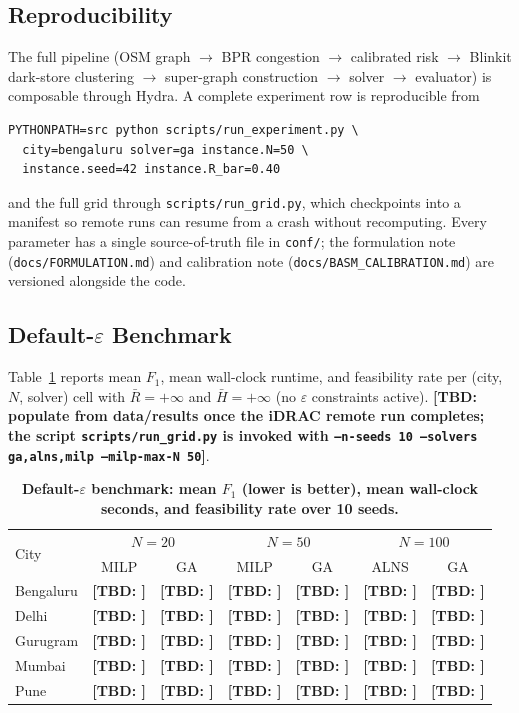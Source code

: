\documentclass{ieeeaccess}
\newcommand{\TBD}[1]{\textbf{[TBD: #1]}}
\begin{document}
\subsection{Reproducibility}
The full pipeline (OSM graph $\rightarrow$ BPR congestion $\rightarrow$
calibrated risk $\rightarrow$ Blinkit dark-store clustering $\rightarrow$
super-graph construction $\rightarrow$ solver $\rightarrow$ evaluator)
is composable through Hydra. A complete experiment row is reproducible
from
\begin{verbatim}
PYTHONPATH=src python scripts/run_experiment.py \
  city=bengaluru solver=ga instance.N=50 \
  instance.seed=42 instance.R_bar=0.40
\end{verbatim}
and the full grid through
\texttt{scripts/run\_grid.py}, which checkpoints into a manifest so
remote runs can resume from a crash without recomputing. Every
parameter has a single source-of-truth file in \texttt{conf/}; the
formulation note (\texttt{docs/FORMULATION.md}) and calibration note
(\texttt{docs/BASM\_CALIBRATION.md}) are versioned alongside the code.

\subsection{Default-$\varepsilon$ Benchmark}
Table~\ref{tab:default-grid} reports mean $F_1$, mean wall-clock
runtime, and feasibility rate per (city, $N$, solver) cell with
$\bar{R} = +\infty$ and $\bar{H} = +\infty$ (no $\varepsilon$
constraints active). \TBD{populate from data/results once the iDRAC
remote run completes; the script
\texttt{scripts/run\_grid.py} is invoked with
\texttt{--n-seeds 10 --solvers ga,alns,milp --milp-max-N 50}}.

\begin{table}
\caption{\textbf{Default-$\varepsilon$ benchmark: mean $F_1$ (lower is better),
mean wall-clock seconds, and feasibility rate over 10 seeds.}}
\label{tab:default-grid}
\centering
\begin{tabular}{lcccccc}
\toprule
\multirow{2}{*}{City} & \multicolumn{2}{c}{$N=20$} & \multicolumn{2}{c}{$N=50$} & \multicolumn{2}{c}{$N=100$} \\
& MILP & GA & MILP & GA & ALNS & GA \\
\midrule
Bengaluru & \TBD{} & \TBD{} & \TBD{} & \TBD{} & \TBD{} & \TBD{} \\
Delhi & \TBD{} & \TBD{} & \TBD{} & \TBD{} & \TBD{} & \TBD{} \\
Gurugram & \TBD{} & \TBD{} & \TBD{} & \TBD{} & \TBD{} & \TBD{} \\
Mumbai & \TBD{} & \TBD{} & \TBD{} & \TBD{} & \TBD{} & \TBD{} \\
Pune & \TBD{} & \TBD{} & \TBD{} & \TBD{} & \TBD{} & \TBD{} \\
\bottomrule
\end{tabular}
\end{table}
\end{document}
